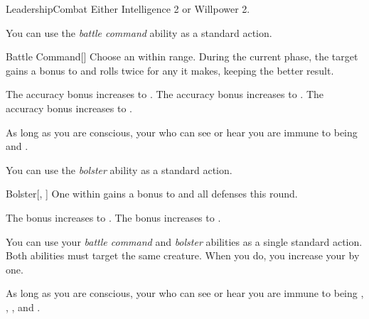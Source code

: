     \begin{feat}{Leadership}{Combat}
        \featpre Either Intelligence 2 or Willpower 2.

         You can use the \textit{battle command} ability as a standard action.
        \begin{activeability}{Battle Command}[]
            \rankline
            Choose an  within \rngmed range.
            During the current phase, the target gains a  bonus to  and rolls twice for any  it makes, keeping the better result.

            \rankline
             The accuracy bonus increases to .
             The accuracy bonus increases to .
             The accuracy bonus increases to .
        \end{activeability}

         As long as you are conscious, your  who can see or hear you are immune to being \shaken and \frightened.

         You can use the \textit{bolster} ability as a standard action.
        \begin{activeability}{Bolster}[, ]
            \rankline
            One  within \medrange gains a  bonus to  and all defenses this round.

            \rankline
             The bonus increases to .
             The bonus increases to .
        \end{activeability}

         You can use your \textit{battle command} and \textit{bolster} abilities as a single standard action.
        Both abilities must target the same creature.
        When you do, you increase your  by one.

         As long as you are conscious, your  who can see or hear you are immune to being \dazed, \stunned, \confused, and \panicked.
    \end{feat}


